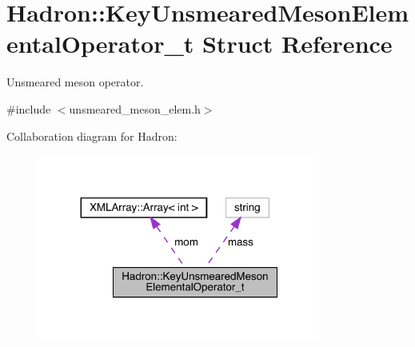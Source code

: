 \hypertarget{structHadron_1_1KeyUnsmearedMesonElementalOperator__t}{}\section{Hadron\+:\+:Key\+Unsmeared\+Meson\+Elemental\+Operator\+\_\+t Struct Reference}
\label{structHadron_1_1KeyUnsmearedMesonElementalOperator__t}


Unsmeared meson operator.  




{\ttfamily \#include $<$unsmeared\+\_\+meson\+\_\+elem.\+h$>$}



Collaboration diagram for Hadron\+:
\nopagebreak
\begin{figure}[H]
\begin{center}
\leavevmode
\includegraphics[width=263pt]{df/d59/structHadron_1_1KeyUnsmearedMesonElementalOperator__t__coll__graph}
\end{center}
\end{figure}
